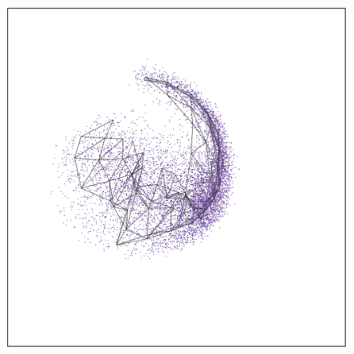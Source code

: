 \documentclass[
  12pt]{article}
\begin{document}
\begin{figure}[H]
\begin{minipage}{0.33\linewidth}
{\captionsetup{labelsep=none}\includegraphics{figures/mnist/sc_2.png}

}

\subcaption{\label{fig-mnist1-sc2}}

\end{minipage}%
%
\begin{minipage}{0.33\linewidth}

\end{minipage}
\end{figure}
\end{document}
